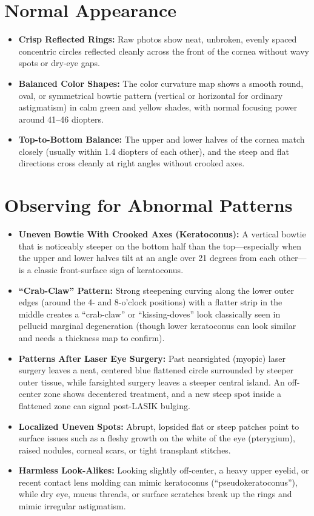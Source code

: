 \section{Normal Appearance}
\begin{itemize}
    \item \textbf{Crisp Reflected Rings:} Raw photos show neat, unbroken, evenly spaced concentric circles reflected cleanly across the front of the cornea without wavy spots or dry-eye gaps.
    \item \textbf{Balanced Color Shapes:} The color curvature map shows a smooth round, oval, or symmetrical bowtie pattern (vertical or horizontal for ordinary astigmatism) in calm green and yellow shades, with normal focusing power around 41--46 diopters.
    \item \textbf{Top-to-Bottom Balance:} The upper and lower halves of the cornea match closely (usually within 1.4 diopters of each other), and the steep and flat directions cross cleanly at right angles without crooked axes.
\end{itemize}

\section{Observing for Abnormal Patterns}
\begin{itemize}
    \item \textbf{Uneven Bowtie With Crooked Axes (Keratoconus):} A vertical bowtie that is noticeably steeper on the bottom half than the top---especially when the upper and lower halves tilt at an angle over 21 degrees from each other---is a classic front-surface sign of keratoconus.
    \item \textbf{``Crab-Claw'' Pattern:} Strong steepening curving along the lower outer edges (around the 4- and 8-o'clock positions) with a flatter strip in the middle creates a ``crab-claw'' or ``kissing-doves'' look classically seen in pellucid marginal degeneration (though lower keratoconus can look similar and needs a thickness map to confirm).
    \item \textbf{Patterns After Laser Eye Surgery:} Past nearsighted (myopic) laser surgery leaves a neat, centered blue flattened circle surrounded by steeper outer tissue, while farsighted surgery leaves a steeper central island. An off-center zone shows decentered treatment, and a new steep spot inside a flattened zone can signal post-LASIK bulging.
    \item \textbf{Localized Uneven Spots:} Abrupt, lopsided flat or steep patches point to surface issues such as a fleshy growth on the white of the eye (pterygium), raised nodules, corneal scars, or tight transplant stitches.
    \item \textbf{Harmless Look-Alikes:} Looking slightly off-center, a heavy upper eyelid, or recent contact lens molding can mimic keratoconus (``pseudokeratoconus''), while dry eye, mucus threads, or surface scratches break up the rings and mimic irregular astigmatism.
\end{itemize}

